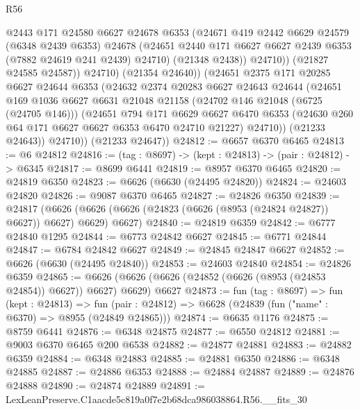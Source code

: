 \begin{lexlean}{R56}
\begin{coremodule}
                  @2443
                  @171
                  @24580
                  @6627
                  @24678
                  @6353
                  (@24671
                    @419
                    @2442
                    @6629
                    @24579
                    (@6348 @2439 @6353)
                    @24678
                    (@24651 @2440 @171 @6627 @6627 @2439 @6353 (@7882 @24619 @241 @2439) @24710)
                    (@21348 @2438))
                  @24710))
              (@21827 @24585 @24587))
            @24710)
          (@21354 @24640))
        (@24651
          @2375
          @171
          @20285
          @6627
          @24644
          @6353
          (@24632
            @2374
            @20283
            @6627
            @24643
            @24644
            (@24651
              @169
              @1036
              @6627
              @6631
              @21048
              @21158
              (@24702 @146 @21048 (@6725 (@24705 @146)))
              (@24651
                @794
                @171
                @6629
                @6627
                @6470
                @6353
                (@24630 @260 @64 @171 @6627 @6627 @6353 @6470 @24710 @21227)
                @24710))
            (@21233 @24643))
          @24710))
      (@21233 @24647))
@24812 := @6657 @6370 @6465
@24813 := @6 @24812
@24816 := (tag : @8697) -> (kept : @24813) -> (pair : @24812) -> @6345
@24817 := @8699 @6441
@24819 := @8957 @6370 @6465
@24820 := @24819 @6350
@24823 := @6626 (@6630 (@24495 @24820))
@24824 := @24603 @24820
@24826 := @9087 @6370 @6465
@24827 := @24826 @6350
@24839 := @24817
    (@6626 (@6626 (@6626 (@24823 (@6626 (@8953 (@24824 @24827)) @6627)) @6627) @6629) @6627)
@24840 := @24819 @6359
@24842 := @6777 @24840 @1295
@24844 := @6773 @24842 @6627
@24845 := @6771 @24844
@24847 := @6784 @24842 @6627
@24849 := @24845 @24847 @6627
@24852 := @6626 (@6630 (@24495 @24840))
@24853 := @24603 @24840
@24854 := @24826 @6359
@24865 := @6626 (@6626 (@6626 (@24852 (@6626 (@8953 (@24853 @24854)) @6627)) @6627) @6629) @6627
@24873 := fun (tag : @8697) =>
  fun (kept : @24813) =>
  fun (pair : @24812) => @6628 (@24839 (fun ("name" : @6370) => @8955 (@24849 @24865)))
@24874 := @6635 @1176
@24875 := @8759 @6441
@24876 := @6348 @24875
@24877 := @6550 @24812
@24881 := @9003 @6370 @6465 @200 @6538
@24882 := @24877 @24881
@24883 := @24882 @6359
@24884 := @6348 @24883
@24885 := @24881 @6350
@24886 := @6348 @24885
@24887 := @24886 @6353
@24888 := @24884 @24887
@24889 := @24876 @24888
@24890 := @24874 @24889
@24891 := LexLeanPreserve.C1aacde5c819a0f7e2b68dca986038864.R56.__fits_30

\end{coremodule}
\end{lexlean}
